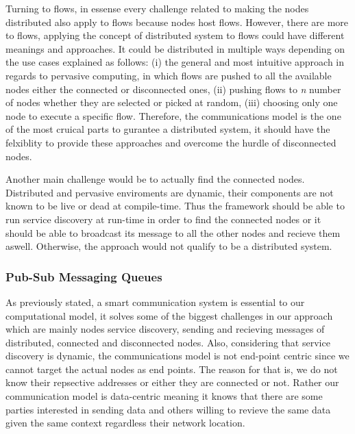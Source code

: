 
Turning to flows, in essense every challenge related to making the nodes distributed also apply to flows because nodes host flows. However, there are more to flows, applying the concept of distributed system to flows could have different meanings and approaches. It could be distributed in multiple ways depending on the use cases explained as follows: (i) the general and most intuitive approach in regards to pervasive computing, in which flows are pushed to all the available nodes either the connected or disconnected ones, (ii) pushing flows to \textit{n} number of nodes whether they are selected or picked at random, (iii) choosing only one node to execute a specific flow. Therefore, the communications model is the one of the most cruical parts to gurantee a distributed system, it should have the felxiblity to provide these approaches and overcome the hurdle of disconnected nodes.

Another main challenge would be to actually find the connected nodes. Distributed and pervasive enviroments are dynamic, their components are not known to be live or dead at compile-time. Thus the framework should be able to run service discovery at run-time in order to find the connected nodes or it should be able to broadcast its message to all the other nodes and recieve them aswell. Otherwise, the approach would not qualify to be a distributed system.


\newpage

\subsubsection{Pub-Sub Messaging Queues}

As previously stated, a smart communication system is essential to our computational model, it solves some of the biggest challenges in our approach which are mainly nodes service discovery, sending and recieving messages of distributed, connected and disconnected nodes. Also, considering that service discovery is dynamic, the communications model is not end-point centric since we cannot target the actual nodes as end points. The reason for that is, we do not know their repsective addresses or either they are connected or not. Rather our communication model is data-centric meaning it knows that there are some parties interested in sending data and others willing to revieve the same data given the same context regardless their network location.




